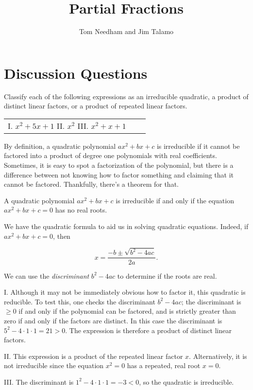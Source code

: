 \documentclass[noauthor, handout]{ximera}
\author{Tom Needham and Jim Talamo}
\title[]{Partial Fractions}
\begin{document}
\begin{abstract}
\end{abstract}
\maketitle

\vspace{-0.9in}

\section{Discussion Questions}

\begin{problem}
Classify each of the following expressions as an irreducible quadratic, a product of distinct linear factors, or a product of repeated linear factors.
\begin{center}
\begin{tabular}{lll}
I. $x^2+5x+1$ \hspace{.4in} II. $x^2$ \hspace{.4in} III. $x^2+x+1$
\end{tabular}
\end{center}
\end{problem}

\begin{freeResponse}
By definition, a quadratic polynomial $ax^2+bx+c$ is irreducible if it cannot be factored into a product of degree one polynomials with real coefficients.  Sometimes, it is easy to spot a factorization of the polynomial, but there is a difference between not knowing how to factor something and claiming that it cannot be factored.  Thankfully, there's a theorem for that.

\begin{theorem}
A quadratic polynomial $ax^2+bx+c$ is irreducible if and only if the equation $ax^2+bx+c=0$ has no real roots.  
\end{theorem}

We have the quadratic formula to aid us in solving quadratic equations.  Indeed, if $ax^2+bx+c=0$, then

\[
x= \frac{-b \pm \sqrt{b^2-4ac}}{2a}.
\]

We can use the \emph{discriminant} $b^2-4ac$ to determine if the roots are real.

I. Although it may not be immediately obvious how to factor it, this quadratic is reducible. To test this, one checks the discriminant $b^2-4ac$; the discriminant is  $\geq 0$ if and only if the polynomial can be factored, and is strictly greater than zero if and only if the factors are distinct. In this case the discriminant is $5^2-4 \cdot 1 \cdot 1 = 21 > 0$. The expression is therefore a product of distinct linear factors.

II. This expression is a product of the repeated linear factor $x$.  Alternatively, it is not irreducible since the equation $x^2=0$ has a repeated, real root $x=0$.

III. The discriminant is $1^2-4 \cdot 1 \cdot 1 = -3 < 0$, so the quadratic is irreducible.
\end{freeResponse}
\end{document}
